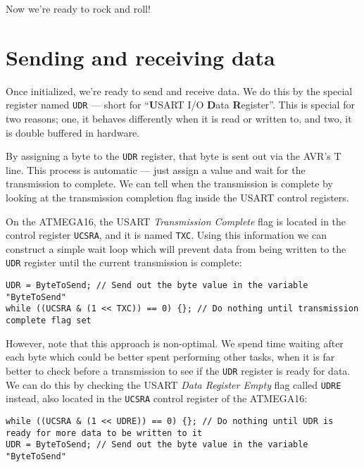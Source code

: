 \documentclass[a4paper,oneside,notitlepage]{book}
\begin{document}
Now we're ready to rock and roll!


\chapter{Sending and receiving data}

Once initialized, we're ready to send and receive data. We do this by the special register named \texttt{UDR} --- short for ``\textbf{U}SART I/O \textbf{D}ata \textbf{R}egister''. This is special for two reasons; one, it behaves differently when it is read or written to, and two, it is double buffered in hardware.

By assigning a byte to the \texttt{UDR} register, that byte is sent out via the AVR's T line. This process is automatic --- just assign a value and wait for the transmission to complete. We can tell when the transmission is complete by looking at the transmission completion flag inside the USART control registers.

On the ATMEGA16, the USART \emph{Transmission Complete} flag is located in the control register \texttt{UCSRA}, and it is named \texttt{TXC}. Using this information we can construct a simple wait loop which will prevent data from being written to the \texttt{UDR} register until the current transmission is complete:

\begin{center}
\begin{lstlisting}
UDR = ByteToSend; // Send out the byte value in the variable "ByteToSend"
while ((UCSRA & (1 << TXC)) == 0) {}; // Do nothing until transmission complete flag set
\end{lstlisting}
\end{center}

However, note that this approach is non-optimal. We spend time waiting after each byte which could be better spent performing other tasks, when it is far better to check before a transmission to see if the \texttt{UDR} register is ready for data. We can do this by checking the USART \emph{Data Register Empty} flag called \texttt{UDRE} instead, also located in the \texttt{UCSRA} control register of the ATMEGA16:

\begin{center}
\begin{lstlisting}
while ((UCSRA & (1 << UDRE)) == 0) {}; // Do nothing until UDR is ready for more data to be written to it
UDR = ByteToSend; // Send out the byte value in the variable "ByteToSend"
\end{lstlisting}
\end{center}
\end{document}
